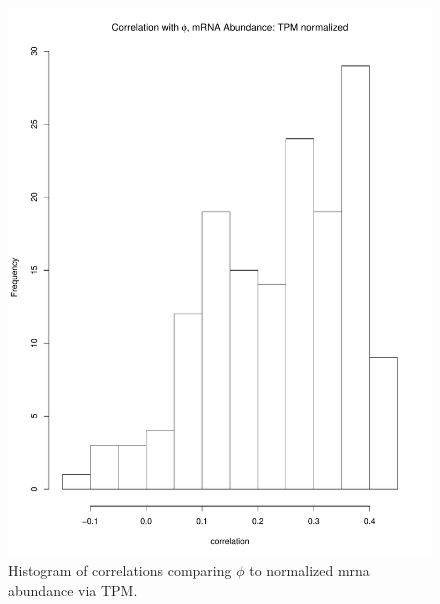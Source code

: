 \documentclass[11pt]{labbook}
\begin{document}
\begin{figure}[H]
\centering
\includegraphics[page=1,scale=0.6]{Ecoli_REL606/correlation_ppr_mrna_tpm.pdf}
\caption{Histogram of correlations comparing $\phi$ to normalized mrna abundance via TPM.}
\end{figure}
\end{document}
